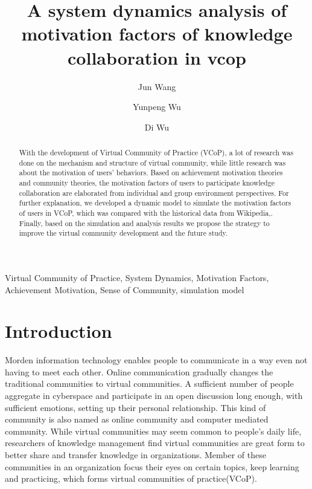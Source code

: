 \documentclass{elsarticle}
\begin{document}
\begin{frontmatter}
\title{A system dynamics analysis of motivation factors of knowledge collaboration in vcop}
\author[buaa]{Jun Wang}

\author[buaa]{Yunpeng Wu}

\author[buaa]{Di Wu}

\address[buaa]{School of Economics and Management, Beihang University, 
Beijing 100083, P.R. China}

\begin{abstract}
 With the development of Virtual Community of Practice (VCoP), a lot of research was done on the mechanism and structure of virtual community, while little research was about the motivation of users’ behaviors. Based on achievement motivation theories and community theories, the motivation factors of users to participate knowledge collaboration are elaborated from individual and group environment perspectives. For further explanation, we developed a dynamic model to simulate the motivation factors of users in VCoP, which was compared with the historical data from Wikipedia,. Finally, based on the simulation and analysis results we propose the strategy to improve the virtual community development and the future study. 

\end{abstract}

\begin{keyword}
  Virtual Community of Practice, System Dynamics, Motivation Factors, Achievement Motivation, Sense of Community, simulation model

\end{keyword}
\end{frontmatter}

\section{Introduction}
\label{sec:introduction}
Morden information technology enables people to communicate in a way
even not having to meet each other. Online communication gradually changes the
traditional communities to virtual communities.  A sufficient number of
people  aggregate in cyberspace and participate in  an open discussion
long enough, with sufficient emotions, setting up  their personal
relationship\cite{rheingold2000vch}. This kind of community is also
named as online community and computer mediated community. While
virtual communities may seem common to people's daily life,
researchers of knowledge management find virtual communities are great
form to better share and transfer knowledge in organizations. Member
of these communities in an organization focus their eyes on certain
topics, keep learning and practicing,  which forms virtual
communities of practice(VCoP). 
\end{document}
